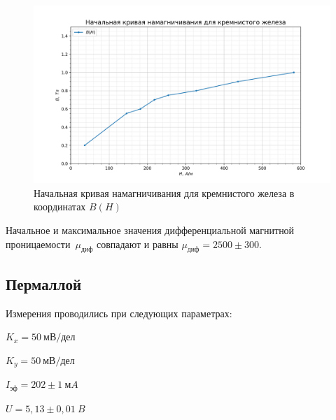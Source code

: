 \documentclass[a4paper, 12pt]{article}
\begin{document}
\begin{figure}[h!]
\begin{center}
    \includegraphics[scale=0.7]{3.4.5_1.png}
\end{center}
\caption{Начальная кривая намагничивания для кремнистого железа в координатах $B(H)$}
\label{fig:Fe-Si:nach_petlya}
\end{figure}

Начальное и максимальное значения дифференциальной магнитной проницаемости~$\mu_{диф}$ совпадают и равны $\mu_{диф} = 2500\pm300$.

\newpage

\subsection{Пермаллой}

Измерения проводились при следующих параметрах:
\begin{description}
\item{} $K_x = 50~мВ/дел$
\item{} $K_y = 50~мВ/дел$
\item{} $I_{эф} = 202\pm1~мA$
\item{} $U = 5,13\pm0,01~B$
\end{description}
\end{document}
